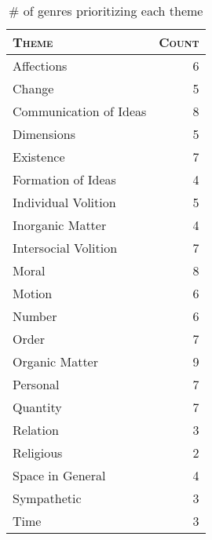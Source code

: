 \begin{table}[h]
    \caption{\# of genres prioritizing each theme}
    \label{tab:theme counts}
    \begin{tabular}{l|r}
        \hline
        \centering
        \textsc{Theme} & \textsc{Count} \\
        \hline
        Affections & 6 \\
        Change & 5 \\
        Communication of Ideas & 8 \\
        Dimensions & 5 \\
        Existence & 7 \\
        Formation of Ideas & 4 \\
        Individual Volition & 5 \\
        Inorganic Matter & 4 \\
        Intersocial Volition & 7 \\
        Moral & 8 \\
        Motion & 6 \\
        Number & 6 \\
        Order & 7 \\
        Organic Matter & 9 \\
        Personal & 7 \\
        Quantity & 7 \\
        Relation & 3 \\
        Religious & 2 \\
        Space in General & 4 \\
        Sympathetic & 3 \\
        Time & 3 \\
        \hline
    \end{tabular}
\end{table}